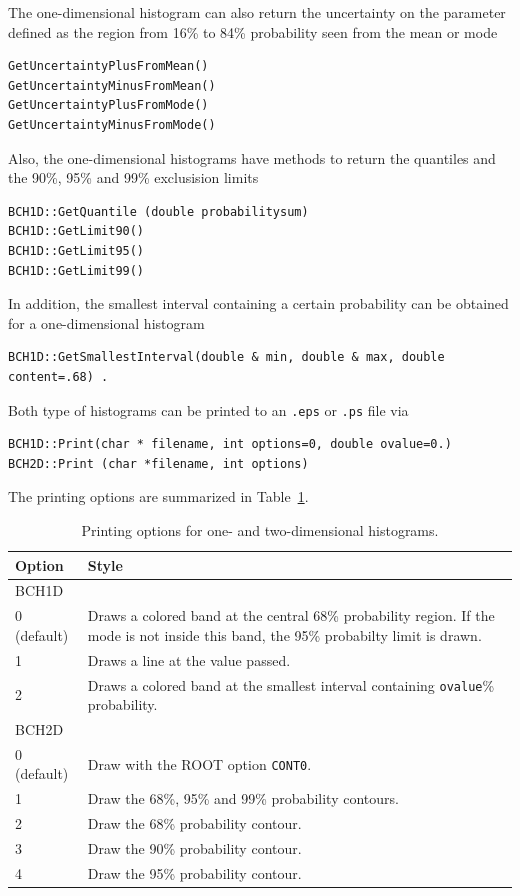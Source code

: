 \documentclass[11pt, a4paper]{article}
\begin{document}
\noindent 
The one-dimensional histogram can also return the uncertainty on the
parameter defined as the region from 16\% to 84\% probability seen
from the mean or mode
%
\begin{verbatim}
GetUncertaintyPlusFromMean()
GetUncertaintyMinusFromMean()
GetUncertaintyPlusFromMode()
GetUncertaintyMinusFromMode()
\end{verbatim} 

\noindent 
Also, the one-dimensional histograms have methods to return the
quantiles and the 90\%, 95\% and 99\% exclusision limits
%
\begin{verbatim} 
BCH1D::GetQuantile (double probabilitysum)
BCH1D::GetLimit90()
BCH1D::GetLimit95()
BCH1D::GetLimit99()
\end{verbatim} 

\noindent 
In addition, the smallest interval containing a certain probability
can be obtained for a one-dimensional histogram 
%
\begin{verbatim}
BCH1D::GetSmallestInterval(double & min, double & max, double content=.68) . 
\end{verbatim}

\noindent 
Both type of histograms can be printed to an \verb|.eps| or \verb|.ps|
file via

\begin{verbatim}
BCH1D::Print(char * filename, int options=0, double ovalue=0.)
BCH2D::Print (char *filename, int options)
\end{verbatim}  

The printing options are summarized in Table~\ref{table:printingoptions}. 

\begin{table}[ht!]
\begin{tabular}{ll}
\hline
Option & Style \\ 
\hline
BCH1D & \\ 
\hline 
0 (default) & \begin{minipage}[l]{12 cm}Draws a colored band at the central 68\% probability region. If the mode is not inside this band, the 95\% probabilty limit is drawn. \end{minipage}\\ 
1           & Draws a line at the value passed. \\ 
2           & Draws a colored band at the smallest interval containing \verb|ovalue|\% probability. \\
\hline 
BCH2D & \\ 
\hline 
0 (default) & Draw with the ROOT option \verb|CONT0|. \\ 
1           & Draw the 68\%, 95\% and 99\% probability contours. \\ 
2           & Draw the 68\% probability contour. \\ 
3           & Draw the 90\% probability contour. \\ 
4           & Draw the 95\% probability contour. \\ 
\hline
\end{tabular}
\caption{Printing options for one- and two-dimensional histograms. 
\label{table:printingoptions}} 
\end{table}
\end{document}
